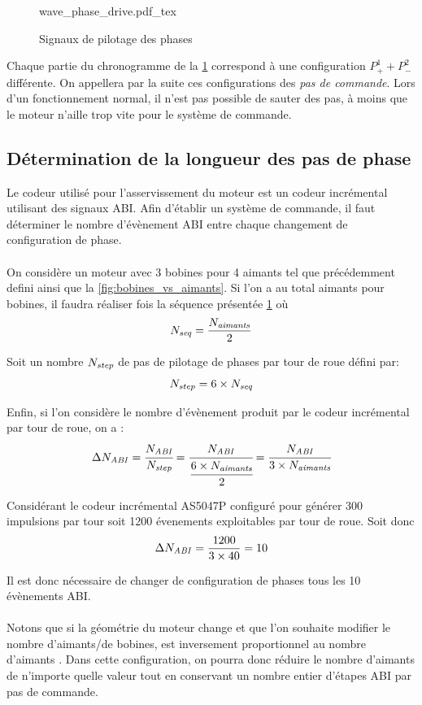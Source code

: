 \begin{figure}[h]
    \centering
    {wave_phase_drive.pdf_tex}
    \caption{Signaux de pilotage des phases}
    \label{fig:wave_phase_drive}
\end{figure}

Chaque partie du chronogramme de la \cref{fig:wave_phase_drive} correspond à une configuration $P^1_+ + P^2_-$ différente.
On appellera par la suite ces configurations des \emph{pas de commande}.
Lors d'un fonctionnement normal, il n'est pas possible de sauter des pas, à moins que le moteur n'aille trop vite pour le système de commande.  

\subsection{Détermination de la longueur des pas de phase}
Le codeur utilisé pour l'asservissement du moteur est un codeur incrémental utilisant des signaux ABI.
Afin d'établir un système de commande, il faut déterminer \dnabi le nombre d'évènement ABI entre chaque changement de configuration de phase.

\paragraph{}
On considère un moteur avec 3 bobines pour 4 aimants tel que précédemment defini ainsi que la \cref{fig:bobines_vs_aimants}.
Si l'on a au total \naimants aimants pour \nbobines bobines, il faudra réaliser \nseq fois la séquence présentée \cref{fig:wave_phase_drive} où
$$N_\mathit{seq} = \frac{N_\mathit{aimants}}{2}$$

Soit un nombre $N_\mathit{step}$ de pas de pilotage de phases par tour de roue défini par:
$$N_\mathit{step} = 6 \times N_\mathit{seq}$$

Enfin, si l'on considère \nabi le nombre d'évènement produit par le codeur incrémental par tour de roue, on a :
$$\Delta N_\mathit{ABI} = \cfrac{N_\mathit{ABI}}{N_\mathit{step}} = \cfrac{N_\mathit{ABI}}{\cfrac{6\times N_\mathit{aimants}}{2}} = \cfrac{N_\mathit{ABI}}{3\times N_\mathit{aimants}}$$

Considérant le codeur incrémental AS5047P configuré pour générer 300 impulsions par tour soit 1200 évenements exploitables par tour de roue.
Soit donc 
$$\Delta N_\mathit{ABI} = \frac{1200}{3\times40} = 10$$

Il est donc nécessaire de changer de configuration de phases tous les 10 évènements ABI.

\paragraph{}
Notons que si la géométrie du moteur change et que l'on souhaite modifier le nombre d'aimants/de bobines, \dnabi est inversement proportionnel au nombre d'aimants \naimants.
Dans cette configuration, on pourra donc réduire le nombre d'aimants de n'importe quelle valeur tout en conservant un nombre entier d'étapes ABI par pas de commande.

